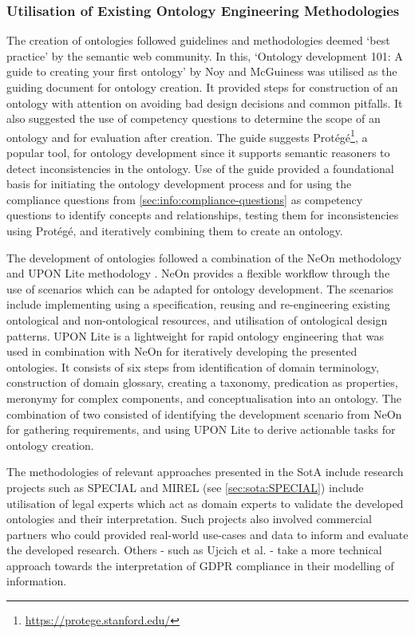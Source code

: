 \subsubsection*{Utilisation of Existing Ontology Engineering Methodologies}
The creation of ontologies followed guidelines and methodologies deemed `best practice' by the semantic web community. In this, `Ontology development 101: A guide to creating your first ontology' by Noy and McGuiness \cite{noy_ontology_2001} was utilised as the guiding document for ontology creation. It provided steps for construction of an ontology with attention on avoiding bad design decisions and common pitfalls. It also suggested the use of competency questions to determine the scope of an ontology and for evaluation after creation.
The guide suggests Protégé\footnote{\url{https://protege.stanford.edu/}}, a popular tool, for ontology development since it supports semantic reasoners to detect inconsistencies in the ontology.
Use of the guide provided a foundational basis for initiating the ontology development process and for using the compliance questions from \autoref{sec:info:compliance-questions} as competency questions to identify concepts and relationships, testing them for inconsistencies using Protégé, and iteratively combining them to create an ontology. 

The development of ontologies followed a combination of the NeOn methodology \cite{suarez-figueroa_neon_2012} and UPON Lite methodology \cite{de_nicola_lightweight_2016}. NeOn provides a flexible workflow through the use of scenarios which can be adapted for ontology development. The scenarios include implementing using a specification, reusing and re-engineering existing ontological and non-ontological resources, and utilisation of ontological design patterns. 
UPON Lite is a lightweight for rapid ontology engineering that was used in combination with NeOn for iteratively developing the presented ontologies. It consists of six steps from identification of domain terminology, construction of domain glossary, creating a taxonomy, predication as properties, meronymy for complex components, and conceptualisation into an ontology.
The combination of two consisted of identifying the development scenario from NeOn for gathering requirements, and using UPON Lite to derive actionable tasks for ontology creation.

The methodologies of relevant approaches presented in the SotA include research projects such as SPECIAL and MIREL (see \autoref{sec:sota:SPECIAL}) include utilisation of legal experts which act as domain experts to validate the developed ontologies and their interpretation. Such projects also involved commercial partners who could provided real-world use-cases and data to inform and evaluate the developed research.
Others - such as Ujcich et al. \cite{belhajjame_provenance_2018} - take a more technical approach towards the interpretation of GDPR compliance in their modelling of information.

